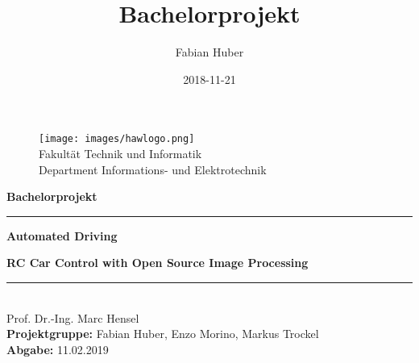 \documentclass[a4paper,12pt]{article}
\title{Bachelorprojekt}
\date{2018-11-21}
\author{Fabian Huber}
\begin{document}
\begin{titlepage}
\begin{figure}[h!]
  \begin{flushright}
  \begin{spacing}{1.5}
  \texttt{[image: images/hawlogo.png]}
  \label{fig:hawlogo}\\
  \small Fakultät Technik und Informatik\\
  \small Department Informations- und Elektrotechnik
  \end{spacing}
  \end{flushright}
\end{figure}
\textbf{\large Bachelorprojekt}
\begin{center}\noindent\textcolor{blue(ncs)}{\rule{13.5cm}{0.5mm}}\end{center}
\begin{spacing}{4.5}
\textbf{\huge Automated Driving}
\end{spacing}
\textbf{\large\indent RC Car Control with Open Source Image Processing}
\begin{center}\noindent\textcolor{blue(ncs)}{\rule{13.5cm}{0.5mm}}\end{center}
\begin{spacing}{1.15}
\vspace*{\fill}
\noindent
\textnormal{\\
  Prof. Dr.-Ing. Marc Hensel \\
  \textbf{Projektgruppe:} Fabian Huber, Enzo Morino, Markus Trockel \\
  \textbf{Abgabe:} 11.02.2019 \\
}
\end{spacing}
\end{titlepage}


	\newpage
	
	
  \newpage
  \tableofcontents
  \newpage




	\newpage
  
 
 	\newpage
  
  
  \newpage  
  

  
  
\end{document}
